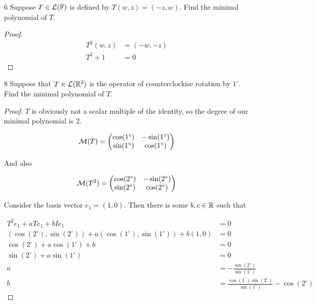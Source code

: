 \begin{enumerate}
\begin{proof}
By the fundamental theorem of algebra,

$$p(T) - \alpha I = c(T - \lambda_1I)\dots(T- \lambda_n I)$$

Since $p(T) - \alpha I$ is not invertible, at least one of the factors here, $(T - \lambda_iI)$, is not invertible. So there is somt $(T - \lambda_i I)v = 0$, so $\lambda_i$ is an eigenvalue of $T$, with $p(\lambda_i) - \alpha I = 0$, so $\alpha = p(\lambda_i)$.
\end{proof}
    
    \item[6] Suppose $T \in \mathcal L(\mathbb{F})$ is defined by $T(w, z) = (-z, w)$. Find the minimal polynomial of $T$.
    
    \begin{proof}
        \begin{align*}
            T^2(w, z) &= (-w, -z) \\
            T^2 + 1 &= 0
        \end{align*}
    \end{proof}

    \item[8] Suppose that $T \in \mathcal L(\mathbb{R}^2)$ is the operator of counterclockise rotation by $1^\circ$. Find the minimal polynomial of $T$.
    
    \begin{proof}
        $T$ is obviously not a scalar multiple of the identity, so the degree of our minimal polynomial is 2.

        $$\mathcal M(T) = \begin{pmatrix}
            \cos(1^\circ) & -\sin(1^\circ) \\
            \sin(1^\circ) & \cos(1^\circ)
        \end{pmatrix}$$

        And also 

        $$\mathcal M(T^2) = \begin{pmatrix}
            \cos(2^\circ) & -\sin(2^\circ) \\
            \sin(2^\circ) & \cos(2^\circ)
        \end{pmatrix}$$

        Consider the basis vector $e_1 = (1, 0)$. Then there is some $b, c \in \mathbb{R}$ such that 

        \begin{align*}
            T^2e_1 + aTe_1 + bIe_1 &= 0 \\
            (\cos(2^\circ), \sin(2^\circ)) + a(\cos(1^\circ), \sin(1^\circ)) + b(1, 0) &= 0\\
            \cos(2^\circ) + a\cos(1^\circ) + b &= 0 \\
            \sin(2^\circ) + a\sin(1^\circ) &= 0 \\
            a &= -\frac{\sin(2^\circ)}{\sin(1^\circ)} \\
            b &= \frac{\cos(1^\circ)\sin(2^\circ)}{\sin(1^\circ)} - \cos(2^\circ)
        \end{align*}


\end{proof}
\end{enumerate}
